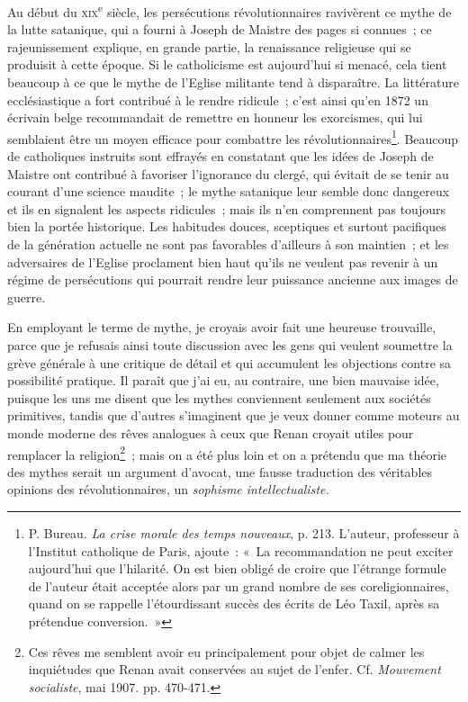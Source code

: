 \documentclass[french,twoside]{book} %
\begin{document}
Au début du {\scshape xix}\textsuperscript{e} siècle, les persécutions révolutionnaires ravivèrent ce mythe de la lutte satanique, qui a fourni à Joseph de Maistre des pages si connues ; ce rajeunissement explique, en grande partie, la renaissance religieuse qui se produisit à cette époque. Si le  catholicisme est aujourd’hui si menacé, cela tient beaucoup à ce que le mythe de l’Eglise militante tend à disparaître. La littérature ecclésiastique a fort contribué à le rendre ridicule ; c’est ainsi qu’en 1872 un écrivain belge recommandait de remettre en honneur les exorcismes, qui lui semblaient être un moyen efficace pour combattre les révolutionnaires\footnote{ \noindent P. Bureau. \emph{La crise morale des temps nouveaux}, p. 213. L’auteur, professeur à l’Institut catholique de Paris, ajoute : « La recommandation ne peut exciter aujourd’hui que l’hilarité. On est bien obligé de croire que l’étrange formule de l’auteur était acceptée alors par un grand nombre de ses coreligionnaires, quand on se rappelle l’étourdissant succès des écrits de Léo Taxil, après sa prétendue conversion. »
 }. Beaucoup de catholiques instruits sont effrayés en constatant que les idées de Joseph de Maistre ont contribué à favoriser l’ignorance du clergé, qui évitait de se tenir au courant d’une science maudite ; le mythe satanique leur semble donc dangereux et ils en signalent les aspects ridicules ; mais ils n’en comprennent pas toujours bien la portée historique. Les habitudes douces, sceptiques et surtout pacifiques de la génération actuelle ne sont pas favorables d’ailleurs à son maintien ; et les adversaires de l’Eglise proclament bien haut qu’ils ne veulent pas revenir à un régime de persécutions qui pourrait rendre leur puissance ancienne aux images de guerre.\par
En employant le terme de mythe, je croyais avoir fait une heureuse trouvaille, parce que je refusais ainsi toute discussion avec les gens qui veulent soumettre la grève générale à une critique de détail et qui accumulent les  objections contre sa possibilité pratique. Il paraît que j’ai eu, au contraire, une bien mauvaise idée, puisque les uns me disent que les mythes conviennent seulement aux sociétés primitives, tandis que d’autres s’imaginent que je veux donner comme moteurs au monde moderne des rêves analogues à ceux que Renan croyait utiles pour remplacer la religion\footnote{ \noindent Ces rêves me semblent avoir eu principalement pour objet de calmer les inquiétudes que Renan avait conservées au sujet de l’enfer. Cf. \emph{Mouvement socialiste}, mai 1907. pp. 470-471.
 } ; mais on a été plus loin et on a prétendu que ma théorie des mythes serait un argument d’avocat, une fausse traduction des véritables opinions des révolutionnaires, un \emph{sophisme intellectualiste.}\par
\end{document}
